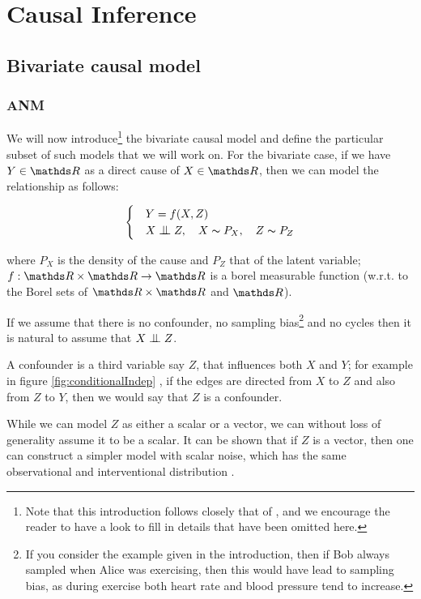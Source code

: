\chapter{Causal Inference}

\section{Bivariate causal model}

\subsection{ANM}

We will now introduce\footnote{Note that this introduction follows closely that of \cite{Mooij2016jmlr}, and 
we encourage the reader to have a look to fill in details that have been omitted here.} 
the bivariate causal model and define the particular subset of such models that 
we will work on. For the bivariate case, if we have $Y \in \R$ as a direct cause of $X \in \R$, then we can model 
the relationship as follows:

\begin{equation}
    \begin{cases} 
        & Y = f(X, Z) \\
        & X \bigCI Z,\quad X \thicksim P_X,\quad Z \thicksim P_{Z}  
     \end{cases}
     \label{causal_model}
\end{equation}

where $P_X$ is the density of the cause and $P_Z$ that of the latent variable; $f: \R \times \R \rightarrow \R$
is a borel measurable function (w.r.t. to the Borel sets of $\R \times \R$ and $\R$). 

If we assume that there is no confounder, no sampling bias\footnote{If you consider the 
example given in the introduction, then if Bob always sampled when Alice was exercising, then this 
would have lead to sampling bias, as during exercise both heart rate and blood pressure tend to increase.} 
and no cycles then it is natural to assume that $X \bigCI Z$.

A confounder is a third variable say $Z$, that influences both $X$ and $Y$; for example in figure \ref{fig:conditionalIndep}
, if the edges are directed from $X$ to $Z$ and also from $Z$ to $Y$, then we would say that $Z$ is a confounder.

While we can model $Z$ as either a scalar or a vector, we can without loss of generality assume it to be a scalar.
It can be shown that if $Z$ is a vector, then one can construct a simpler model with scalar noise, which has the 
same observational and interventional distribution \cite{Mooij2016jmlr}.

